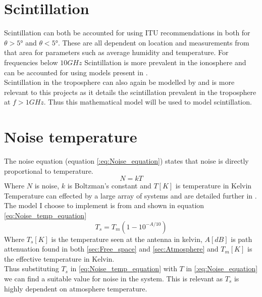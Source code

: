 \documentclass[conference]{IEEEtran}
\begin{document}
\label{sec:Rain}


\section{Scintillation}
Scintillation can both be accounted for using ITU recommendations in \cite{ITU-R_P.618-7} both for $\theta> 5°$ and $\theta < 5°$. These are all dependent on location and measurements from that area for parameters such as average humidity and temperature. For frequencies below $10G Hz$ Scintillation is more prevalent in the ionosphere and can be accounted for using models present in \cite{ITU-R_P.531-14}.\\ 

Scintillation in the troposphere can also again be modelled by \cite{ITU-R_P.618-7} and is more relevant to this projects as it details the scintillation prevalent in the troposphere at $f > 1G Hz$. Thus this mathematical model will be used to model scintillation.


\label{sec:Scintillation}

\section{Noise temperature}
The noise equation (equation \ref{:eq:Noise_equation}) states that noise is directly proportional to temperature. 
\begin{equation}
N = kT
\label{:eq:Noise_equation}
\end{equation}
Where $N$ is noise, $k$ is Boltzman's constant and $T[K]$ is temperature in Kelvin\\

Temperature can effected by a large array of systems and are detailed further in \cite{ITU-R_P.372-16}. The model I choose to implement is from \cite{ITU-R_P.618-7} and shown in equation \ref{eq:Noise_temp_equation}
\begin{equation}
T_s = T_m(1-10^{-A/10})
\label{eq:Noise_temp_equation}
\end{equation}
Where $T_s[K]$ is the temperature seen at the antenna in kelvin, $A[dB]$ is path attenuation found in both \ref{sec:Free_space} and \ref{sec:Atmosphere} and $T_m [K]$ is the effective temperature in Kelvin.\\

Thus substituting $T_s$ in \ref{eq:Noise_temp_equation} with $T$ in \ref{:eq:Noise_equation} we can find a suitable value for noise in the system. This is relevant as $T_s$ is highly dependent on atmosphere temperature. 
\end{document}
